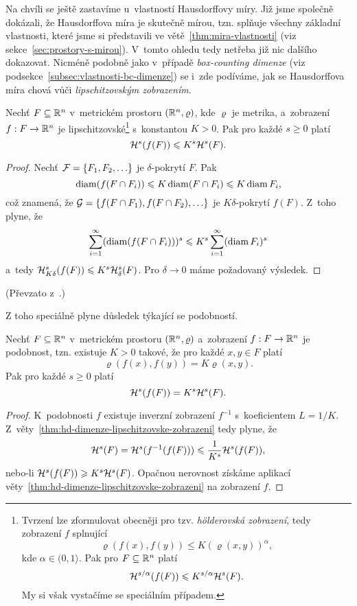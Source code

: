 Na chvíli se ještě zastavíme u~vlastností Hausdorffovy míry. Již jsme společně dokázali, že Hausdorffova míra je skutečně mírou, tzn. splňuje všechny základní vlastnosti, které jsme si představili ve větě~\ref{thm:mira-vlastnosti} (viz sekce~\ref{sec:prostory-s-mirou}). V~tomto ohledu tedy netřeba již nic dalšího dokazovat. Nicméně podobně jako v~případě \emph{box-counting dimenze} (viz podsekce~\ref{subsec:vlastnosti-bc-dimenze}) se i~zde podíváme, jak se Hausdorffova míra chová vůči \emph{lipschitzovským zobrazením}.
\begin{theorem}\label{thm:hd-dimenze-lipschitzovske-zobrazeni}
    Nechť $F\subseteq\R^n$ v~metrickém prostoru $(\R^n,\varrho)$, kde $\varrho$ je metrika, a~zobrazení $\mapping{f}{F}{\R^n}$ je lipschitzovské\footnote{Tvrzení lze zformulovat obecněji pro tzv. \emph{hölderovská zobrazení}, tedy zobrazení $f$ splnující
    \[\varrho(f(x),f(y))\leqslant K(\varrho(x,y))^\alpha,\]
    kde $\alpha\in(0,1\rangle$. Pak pro $F\subseteq\R^n$ platí
    \[\hausdorffmeasure{s/\alpha}(f(F))\leqslant K^{s/\alpha}\hausdorffmeasure{s}(F).\]
    My si však vystačíme se speciálním případem.} s~konstantou $K>0$. Pak pro každé $s\geqslant 0$ platí
    \[\hausdorffmeasure{s}(f(F))\leqslant K^s\hausdorffmeasure{s}(F).\]
\end{theorem}
\begin{proof}
    Nechť $\mathcal{F}=\set{F_1,F_2,\ldots}$ je $\delta$-pokrytí $F$. Pak
    \[\diam(f(F\cap F_i))\leqslant K\diam(F\cap F_i)\leqslant K\diam{F_i},\]
    což znamená, že $\mathcal{G}=\set{f(F\cap F_1),f(F\cap F_2),\ldots}$ je $K\delta$-pokrytí $f(F)$. Z~toho plyne, že
    \[\sum_{i=1}^{\infty}(\diam(f(F\cap F_i)))^s\leqslant K^s\sum_{i=1}^{\infty}(\diam{F_i})^s\]
    a~tedy $\hausdorffdeltameasure{s}{K\delta}(f(F))\leqslant K^s\hausdorffdeltameasure{s}{\delta}(F)$. Pro $\delta\to 0$ máme požadovaný výsledek.
\end{proof}
(Převzato z~\citep[str. 46]{Falconer2014}.)

Z toho speciálně plyne důsledek týkající se podobností.
\begin{corollary}\label{cor:hd-dimenze-podobnost}
    Nechť $F\subseteq\R^n$ v~metrickém prostoru $(\R^n,\varrho)$ a~zobrazení $\mapping{f}{F}{\R^n}$ je podobnost, tzn. existuje $K>0$ takové, že pro každé $x,y\in F$ platí
    \[\varrho(f(x),f(y))=K\varrho(x,y).\]
    Pak pro každé $s\geqslant 0$ platí
    \[\hausdorffmeasure{s}(f(F))=K^s\hausdorffmeasure{s}(F).\]
\end{corollary}
\begin{proof}
    K~podobnosti $f$ existuje inverzní zobrazení $f^{-1}$ s~koeficientem $L=1/K$. Z~věty~\ref{thm:hd-dimenze-lipschitzovske-zobrazeni} tedy plyne, že
    \[\hausdorffmeasure{s}(F)=\hausdorffmeasure{s}(f^{-1}(f(F)))\leqslant\dfrac{1}{K^s}\hausdorffmeasure{s}(f(F)),\]
    nebo-li $\hausdorffmeasure{s}(f(F))\geqslant K^s\hausdorffmeasure{s}(F)$. Opačnou nerovnost získáme aplikací věty~\ref{thm:hd-dimenze-lipschitzovske-zobrazeni} na zobrazení $f$.
\end{proof}

